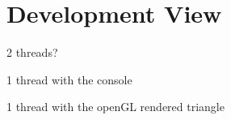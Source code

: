 \section{Development View}
\label{section:devView}

2 threads?

1 thread with the console

1 thread with the openGL rendered triangle

